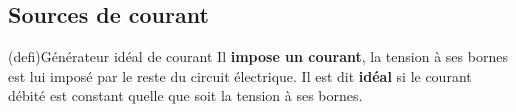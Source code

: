 \documentclass[../../main/main.tex]{subfiles}
\begin{document}
\subsection{Sources de courant}

\begin{tcb}[label=def:gentens, sidebyside, righthand ratio=.2](defi){Générateur
			idéal de courant}
	Il \textbf{impose un courant}, la tension à ses bornes est lui imposé par le
	reste du circuit électrique. Il est dit \textbf{idéal} si le courant débité
	est constant quelle que soit la tension à ses bornes.
	\tcblower
	\vspace{-10pt}
	\begin{center}
		\vspace{-10pt}
	\end{center}
\end{tcb}
\end{document}
